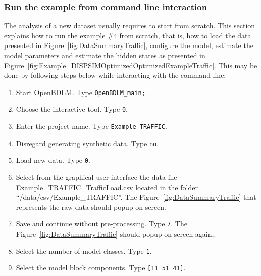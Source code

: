 \subsubsection{Run the example from command line interaction}

The analysis of a new dataset usually requires to start from scratch.
This section explains how to run the example \#4 from scratch, that is, how to load the data presented in Figure~\ref{fig:DataSummaryTraffic}, configure the model, estimate the model parameters and estimate the hidden states as presented in Figure~\ref{fig:Example_DISPSIMOptimizedOptimizedExampleTraffic}.
This may be done by following steps below while interacting with the \MATLAB{} command line:
\begin{enumerate}
\item Start OpenBDLM. Type \colorbox{light-gray}{\lstinline[basicstyle = \mlttfamily \small, backgroundcolor = \color{light-gray}]!OpenBDLM_main;!}.
\item Choose the interactive tool. Type \colorbox{light-gray}{\lstinline[basicstyle = \mlttfamily \small, backgroundcolor = \color{light-gray}]!0!}.
\item Enter the project name. Type \colorbox{light-gray}{\lstinline[basicstyle = \mlttfamily \small, backgroundcolor = \color{light-gray}]!Example_TRAFFIC!}. 
\item Disregard generating synthetic data. Type \colorbox{light-gray}{\lstinline[basicstyle = \mlttfamily \small, backgroundcolor = \color{light-gray}]!no!}. 
\item Load new data. Type \colorbox{light-gray}{\lstinline[basicstyle = \mlttfamily \small, backgroundcolor = \color{light-gray}]!0!}.
\item Select from the graphical user interface the data file Example\_TRAFFIC\_TrafficLoad.csv located in the folder ``/data/csv/Example\_TRAFFIC''. The Figure~\ref{fig:DataSummaryTraffic} that represents the raw data should popup on screen.
\item Save and continue without pre-processing. Type \colorbox{light-gray}{\lstinline[basicstyle = \mlttfamily \small, backgroundcolor = \color{light-gray}]!7!}. The Figure~\ref{fig:DataSummaryTraffic} should popup on screen again,.
\item Select the number of model classes. Type \colorbox{light-gray}{\lstinline[basicstyle = \mlttfamily \small, backgroundcolor = \color{light-gray}]!1!}. 
\item Select the model block components. Type \colorbox{light-gray}{\lstinline[basicstyle = \mlttfamily \small, backgroundcolor = \color{light-gray}]![11 51 41]!}.

\end{enumerate}
